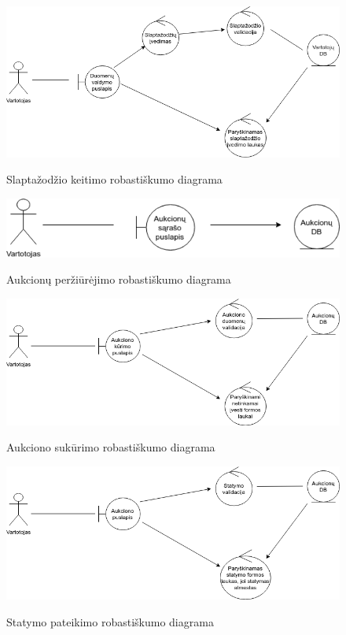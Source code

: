 \documentclass{VUMIFPSkursinis}
\begin{document}
		\begin{figure}[H]
		\centering
		\includegraphics[width=\linewidth]{img/slaptazodis.png}
		\label{fig:slaptazodis}
		\caption{Slaptažodžio keitimo robastiškumo diagrama}
	\end{figure}

		\begin{figure}[H]
		\centering
		\includegraphics[width=\linewidth]{img/aukcionai.png}
		\label{fig:aukcionai}
		\caption{Aukcionų peržiūrėjimo robastiškumo diagrama}
	\end{figure}

		\begin{figure}[H]
		\centering
		\includegraphics[width=\linewidth]{img/sukurti.png}
		\label{fig:sukurti}
		\caption{Aukciono sukūrimo robastiškumo diagrama}
	\end{figure}

		\begin{figure}[H]
		\centering
		\includegraphics[width=\linewidth]{img/statymas.png}
		\label{fig:statymas}
		\caption{Statymo pateikimo robastiškumo diagrama}
	\end{figure}
\end{document}
